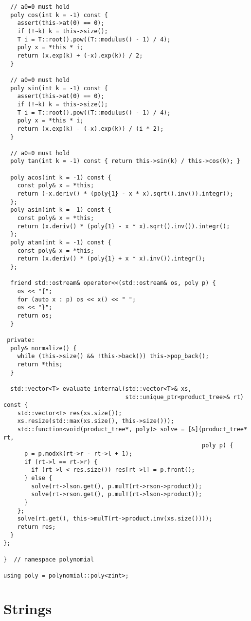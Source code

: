 \documentclass{article}
\begin{document}
\begin{multicols}{2}
\begin{lstlisting}
  // a0=0 must hold
  poly cos(int k = -1) const {
    assert(this->at(0) == 0);
    if (!~k) k = this->size();
    T i = T::root().pow((T::modulus() - 1) / 4);
    poly x = *this * i;
    return (x.exp(k) + (-x).exp(k)) / 2;
  }

  // a0=0 must hold
  poly sin(int k = -1) const {
    assert(this->at(0) == 0);
    if (!~k) k = this->size();
    T i = T::root().pow((T::modulus() - 1) / 4);
    poly x = *this * i;
    return (x.exp(k) - (-x).exp(k)) / (i * 2);
  }

  // a0=0 must hold
  poly tan(int k = -1) const { return this->sin(k) / this->cos(k); }

  poly acos(int k = -1) const {
    const poly& x = *this;
    return (-x.deriv() * (poly{1} - x * x).sqrt().inv()).integr();
  };
  poly asin(int k = -1) const {
    const poly& x = *this;
    return (x.deriv() * (poly{1} - x * x).sqrt().inv()).integr();
  };
  poly atan(int k = -1) const {
    const poly& x = *this;
    return (x.deriv() * (poly{1} + x * x).inv()).integr();
  };

  friend std::ostream& operator<<(std::ostream& os, poly p) {
    os << "{";
    for (auto x : p) os << x() << " ";
    os << "}";
    return os;
  }

 private:
  poly& normalize() {
    while (this->size() && !this->back()) this->pop_back();
    return *this;
  }

  std::vector<T> evaluate_internal(std::vector<T>& xs,
                                   std::unique_ptr<product_tree>& rt) const {
    std::vector<T> res(xs.size());
    xs.resize(std::max(xs.size(), this->size()));
    std::function<void(product_tree*, poly)> solve = [&](product_tree* rt,
                                                         poly p) {
      p = p.modxk(rt->r - rt->l + 1);
      if (rt->l == rt->r) {
        if (rt->l < res.size()) res[rt->l] = p.front();
      } else {
        solve(rt->lson.get(), p.mulT(rt->rson->product));
        solve(rt->rson.get(), p.mulT(rt->lson->product));
      }
    };
    solve(rt.get(), this->mulT(rt->product.inv(xs.size())));
    return res;
  }
};

}  // namespace polynomial

using poly = polynomial::poly<zint>;
\end{lstlisting}

  \section{Strings}


\end{multicols}
\end{document}
